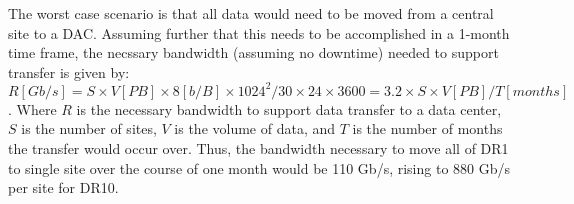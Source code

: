 



The worst case scenario is that all data would need to be moved from a central site to a DAC.  Assuming further that this
needs to be accomplished in a 1-month time frame, the necssary bandwidth (assuming no downtime) needed to support transfer 
is given by: 
$$ R[Gb/s] = S \times V[PB] \times 8 [b/B] \times 1024^2 / 30 \times 24 \times 3600 = 3.2 \times S \times V[PB] / T[months] $$.
Where $R$ is the necessary bandwidth to support data transfer to a data center, $S$ is the number of sites, $V$ is the volume of data, 
and $T$ is the number of months the transfer would occur over.  Thus, the bandwidth necessary
to move all of DR1 to single site over the course of one month would be 110 Gb/s, rising to 880 Gb/s per site for DR10.

